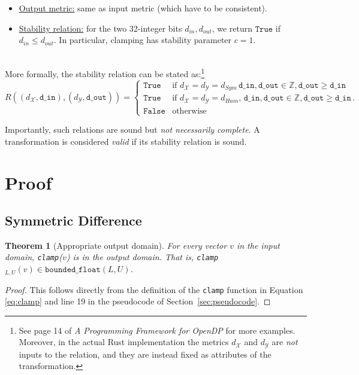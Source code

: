 \documentclass[11pt,a4paper]{article}
\newtheorem{theorem}{Theorem}
\theoremstyle{definition}
\newcommand{\Z}{\mathbb{Z}}
\newcommand{\din}{\texttt{d\_in}}
\newcommand{\dout}{\texttt{d\_out}}
\newcommand{\X}{\mathcal{X}}
\newcommand{\Y}{\mathcal{Y}}
\newcommand{\True}{\texttt{True}}
\newcommand{\False}{\texttt{False}}
\newcommand{\silvia}[1]{{ {\color{blue}{(silvia)~#1}}}}
\begin{document}
\begin{itemize}
    \item \underline{Output metric:} same as input metric (which have to be consistent).
    \item \underline{Stability relation:} for the two 32-integer bits $d_{in}, d_{out}$, we return $\True$ if $d_{in} \leq d_{out}$. In particular, clamping has stability parameter $c=1$. \\\
\end{itemize}

More formally, the stability relation can be stated as:\footnote{See page 14 of \textit{A Programming Framework for OpenDP} for more examples. Moreover, in the actual Rust implementation the metrics $d_{\X}$ and $d_{\Y}$ are \textit{not} inputs to the relation, and they are instead fixed as attributes of the transformation.}
\begin{equation}
    R((d_{\X}, \din), (d_{\Y}, \dout)) = 
    \begin{cases} 
      \True & \textrm{if } d_{\X} = d_{\Y} = d_{Sym} \, \din, \dout \in \Z, \dout \geq \din \\
      \True & \textrm{if } d_{\X} = d_{\Y} = d_{Ham}, \, \din, \dout \in \Z, \dout \geq \din \, . \\
      \False & \textrm{otherwise}
   \end{cases}
\end{equation}

Importantly, such relations are sound but \textit{not necessarily complete}. A transformation is considered \textit{valid} if its stability relation is sound.

\section{Proof}
\subsection{Symmetric Difference}
\begin{theorem}[Appropriate output domain]
    For every vector $v$ in the input domain, \texttt{clamp}($v$) is in the output domain. That is, \texttt{clamp}$_{L, U}(v) \in \texttt{bounded\_float}(L, U)$. %
\end{theorem}

\begin{proof}
This follows directly from the definition of the \texttt{clamp} function in Equation \eqref{eq:clamp} and line 19 in the pseudocode of Section~\ref{sec:pseudocode}. \silvia{Detail more?}
\end{proof}
\end{document}
